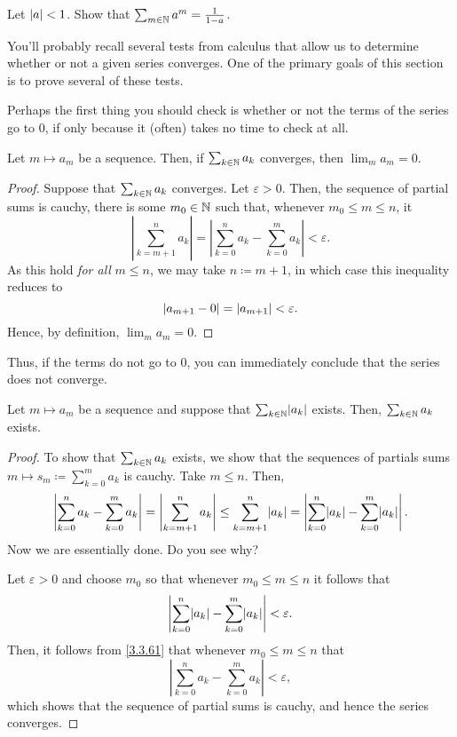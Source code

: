 \begin{exr}
Let $\lvert a\rvert<1$.  Show that $\sum _{m\in \mathbb{N}}a^m=\frac{1}{1-a}$.
\end{exr}

You'll probably recall several tests from calculus that allow us to determine whether or not a given series converges.  One of the primary goals of this section is to prove several of these tests.

Perhaps the first thing you should check is whether or not the terms of the series go to $0$, if only because it (often) takes no time to check at all.
\begin{prp}
Let $m\mapsto a_m$ be a sequence.  Then, if $\sum _{k\in \mathbb{N}}a_k$ converges, then $\lim _ma_m=0$.
\begin{proof}
Suppose that $\sum _{k\in \mathbb{N}}a_k$ converges.  Let $\varepsilon >0$.  Then, the sequence of partial sums is cauchy, there is some $m_0\in \mathbb{N}$ such that, whenever $m_0\leq m\leq n$, it 
\begin{equation}
\left| \sum _{k=m+1}^na_k\right| =\left| \sum _{k=0}^na_k-\sum _{k=0}^ma_k\right| <\varepsilon .
\end{equation}
As this hold \emph{for all} $m\leq n$, we may take $n\coloneqq m+1$, in which case this inequality reduces to
\begin{equation}
\lvert a_{m+1}-0\rvert=\lvert a_{m+1}\rvert<\varepsilon .
\end{equation}
Hence, by definition, $\lim _ma_m=0$.
\end{proof}
\end{prp}
Thus, if the terms do not go to $0$, you can immediately conclude that the series does not converge.
\begin{prp}
Let $m\mapsto a_m$ be a sequence and suppose that $\sum _{k\in \mathbb{N}}\lvert a_k\rvert$ exists.  Then, $\sum _{k\in \mathbb{N}}a_k$ exists.
\begin{proof}
To show that $\sum _{k\in \mathbb{N}}a_k$ exists, we show that the sequences of partials sums $m\mapsto s_m\coloneqq \sum _{k=0}^ma_k$ is cauchy.  Take $m\leq n$.  Then,
\begin{equation}\label{3.3.61}
\left| \sum _{k=0}^na_k-\sum _{k=0}^ma_k\right| =\left| \sum _{k=m+1}^na_k\right| \leq \sum _{k=m+1}^n\lvert a_k\rvert=\left| \sum _{k=0}^n\lvert a_k\rvert-\sum _{k=0}^m\lvert a_k\rvert\right| .
\end{equation}
Now we are essentially done.  Do you see why?

Let $\varepsilon >0$ and choose $m_0$ so that whenever $m_0\leq m\leq n$ it follows that
\begin{equation}
\left| \sum _{k=0}^n\lvert a_k\rvert-\sum _{k=0}^m\lvert a_k\rvert\right| <\varepsilon .
\end{equation}
Then, it follows from \eqref{3.3.61} that whenever $m_0\leq m\leq n$ that
\begin{equation}
\left| \sum _{k=0}^na_k-\sum _{k=0}^ma_k\right| <\varepsilon ,
\end{equation}
which shows that the sequence of partial sums is cauchy, and hence the series converges.
\end{proof}
\end{prp}

